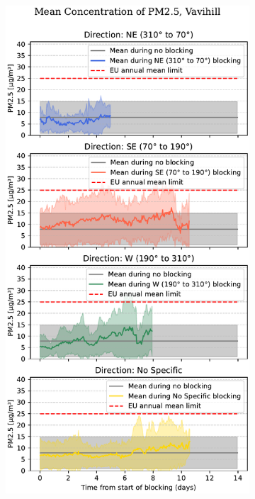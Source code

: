 \begin{figure}[H]
    \centering
    \begin{subfigure}[b]{0.49\textwidth}
        \centering
        \includegraphics[width=\textwidth]{Figures/Meanplot_dir_Vavihill.pdf}

\end{subfigure}
\end{figure}
